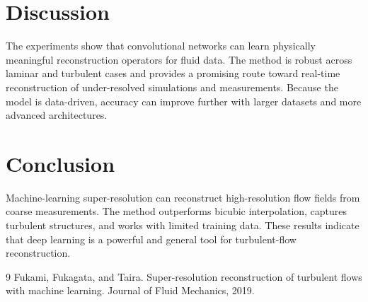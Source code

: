 \documentclass[11pt]{article}
\begin{document}
\section{Discussion}
The experiments show that convolutional networks can learn physically meaningful reconstruction operators for fluid data. The method is robust across laminar and turbulent cases and provides a promising route toward real-time reconstruction of under-resolved simulations and measurements. Because the model is data-driven, accuracy can improve further with larger datasets and more advanced architectures.

\section{Conclusion}
Machine-learning super-resolution can reconstruct high-resolution flow fields from coarse measurements. The method outperforms bicubic interpolation, captures turbulent structures, and works with limited training data. These results indicate that deep learning is a powerful and general tool for turbulent-flow reconstruction.

\begin{thebibliography}{9}
 Fukami, Fukagata, and Taira. Super-resolution reconstruction of turbulent flows with machine learning. Journal of Fluid Mechanics, 2019.
\end{thebibliography}
\end{document}
